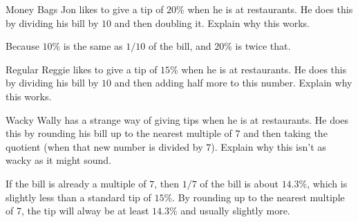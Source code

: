 \documentclass[nooutcomes]{ximera}
\begin{document}
\begin{problem}Money Bags Jon likes to give a tip of $20$\% when he is at
  restaurants. He does this by dividing his bill by $10$ and then
  doubling it. Explain why this works.
\begin{freeResponse}
\begin{hint}
Because $10\%$ is the same as $1/10$ of the bill, and $20\%$ is twice that.  
\end{hint}
\end{freeResponse}
\end{problem} 

\begin{problem}Regular Reggie likes to give a tip of $15$\% when he is at
  restaurants. He does this by dividing his bill by $10$ and then
  adding half more to this number. Explain why this works.
\end{problem} 

\begin{problem}Wacky Wally has a strange way of giving tips when he is at
  restaurants. He does this by rounding his bill up to the nearest
  multiple of $7$ and then taking the quotient (when that new number
  is divided by $7$). Explain why this isn't as wacky as it might
  sound.
\begin{freeResponse}
\begin{hint}
If the bill is already a multiple of $7$, then $1/7$ of the bill is about $14.3\%$, which is slightly less than a standard tip of $15\%$.  By rounding up to the nearest multiple of 7, the tip will alway be at least $14.3\%$ and usually slightly more.  
\end{hint}
\end{freeResponse}
\end{problem} 


%
\end{document}
